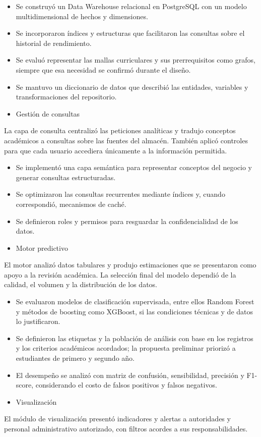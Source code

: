 \documentclass[11pt,oneside,openany]{book}
\begin{document}
\begin{itemize}[leftmargin=*]
\item Se construyó un Data Warehouse relacional en PostgreSQL con un modelo multidimensional de hechos y dimensiones.
\item Se incorporaron índices y estructuras que facilitaron las consultas sobre el historial de rendimiento.
\item Se evaluó representar las mallas curriculares y sus prerrequisitos como grafos, siempre que esa necesidad se confirmó durante el diseño.
\item Se mantuvo un diccionario de datos que describió las entidades, variables y transformaciones del repositorio.
\item Gestión de consultas
\end{itemize}
La capa de consulta centralizó las peticiones analíticas y tradujo conceptos académicos a consultas sobre las fuentes del almacén. También aplicó controles para que cada usuario accediera únicamente a la información permitida.

\begin{itemize}[leftmargin=*]
\item Se implementó una capa semántica para representar conceptos del negocio y generar consultas estructuradas.
\item Se optimizaron las consultas recurrentes mediante índices y, cuando correspondió, mecanismos de caché.
\item Se definieron roles y permisos para resguardar la confidencialidad de los datos.
\item Motor predictivo
\end{itemize}
El motor analizó datos tabulares y produjo estimaciones que se presentaron como apoyo a la revisión académica. La selección final del modelo dependió de la calidad, el volumen y la distribución de los datos.

\begin{itemize}[leftmargin=*]
\item Se evaluaron modelos de clasificación supervisada, entre ellos Random Forest y métodos de boosting como XGBoost, si las condiciones técnicas y de datos lo justificaron.
\item Se definieron las etiquetas y la población de análisis con base en los registros y los criterios académicos acordados; la propuesta preliminar priorizó a estudiantes de primero y segundo año.
\item El desempeño se analizó con matriz de confusión, sensibilidad, precisión y F1-score, considerando el costo de falsos positivos y falsos negativos.
\item Visualización
\end{itemize}
El módulo de visualización presentó indicadores y alertas a autoridades y personal administrativo autorizado, con filtros acordes a sus responsabilidades.
\end{document}
